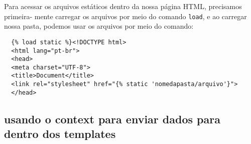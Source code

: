 \documentclass[12pt, a4paper]{paper}
\begin{document}
Para acessar os arquivos estáticos dentro da nossa página HTML, precisamos 
primeira- 
mente carregar os arquivos por meio do comando \texttt{load}, e ao carregar nossa pasta, 
podemos usar os arquivos por meio do comando:

\begin{verbatim}
  {% load static %}<!DOCTYPE html>
  <html lang="pt-br">
  <head>
  <meta charset="UTF-8">
  <title>Document</title>
  <link rel="stylesheet" href="{% static 'nomedapasta/arquivo'}">
  </head>
\end{verbatim}

\subsection{usando o context para enviar dados para dentro dos templates} %
\label{sub:usando o context para enviar dados para dentro dos templates}

\end{document}
